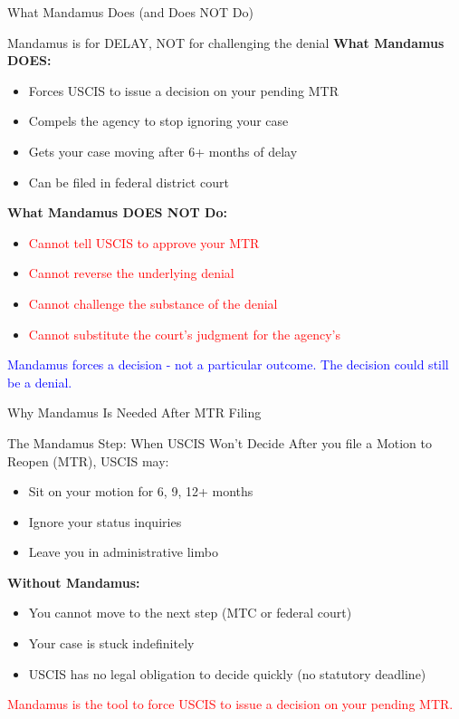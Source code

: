 \documentclass[11pt]{beamer}
\begin{document}
	
	\begin{frame}{What Mandamus Does (and Does NOT Do)}
		\scriptsize
		\begin{block}{Mandamus is for DELAY, NOT for challenging the denial}
			\textbf{What Mandamus DOES:}
			\begin{itemize}
				\item Forces USCIS to issue a decision on your pending MTR
				\item Compels the agency to stop ignoring your case
				\item Gets your case moving after 6+ months of delay
				\item Can be filed in federal district court
			\end{itemize}
			\textbf{What Mandamus DOES NOT Do:}
			\begin{itemize}
				\item \textcolor{red}{Cannot tell USCIS to approve your MTR}
				\item \textcolor{red}{Cannot reverse the underlying denial}
				\item \textcolor{red}{Cannot challenge the substance of the denial}
				\item \textcolor{red}{Cannot substitute the court's judgment for the agency's}
			\end{itemize}
			\textcolor{blue}{Mandamus forces a decision - not a particular outcome. The decision could still be a denial.}
		\end{block}
	\end{frame}
	
	\begin{frame}{Why Mandamus Is Needed After MTR Filing}
		\scriptsize
		\begin{block}{The Mandamus Step: When USCIS Won't Decide}
			After you file a Motion to Reopen (MTR), USCIS may:
			\vspace{0.2cm}
			\begin{itemize}
				\item Sit on your motion for 6, 9, 12+ months
				\item Ignore your status inquiries
				\item Leave you in administrative limbo
			\end{itemize}
			\textbf{Without Mandamus:}
			\begin{itemize}
				\item You cannot move to the next step (MTC or federal court)
				\item Your case is stuck indefinitely
				\item USCIS has no legal obligation to decide quickly (no statutory deadline)
			\end{itemize}
			\textcolor{red}{Mandamus is the tool to force USCIS to issue a decision on your pending MTR.}
		\end{block}
	\end{frame}
	
\end{document}
